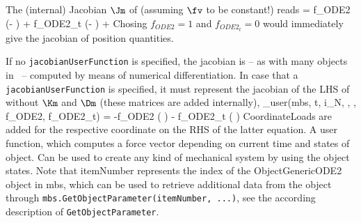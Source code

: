     The (internal) Jacobian $\Jm$ of  (assuming $\fv$ to be constant!) reads
    \be
      \Jm = f_{ODE2}   \left(\Km - \right) + 
            f_{ODE2_t} \left(\Dm -  \right) + 
    \ee
    Chosing $f_{ODE2} = 1$ and $f_{ODE2_t}=0$ would immediately give the jacobian of position quantities.
    
    If no \texttt{jacobianUserFunction} is specified, the jacobian is -- as with many objects in \codeName\ -- computed 
    by means of numerical differentiation.
    In case that a \texttt{jacobianUserFunction} is specified, it must represent the jacobian of the \ac{LHS} of  
    without $\Km$ and $\Dm$ (these matrices are added internally),
    \be \label{eq_ObjectGenericODE2_Jac}
      \Jm_{user}(mbs, t, i_N, \qv, \dot \qv, f_{ODE2}, f_{ODE2_t}) =
            -f_{ODE2}   \left( \right) - 
             f_{ODE2_t} \left( \right)
    \ee
    CoordinateLoads are added for the respective  coordinate on the RHS of the latter equation.
    A user function, which computes a force vector depending on current time and states of object. Can be used to create any kind of mechanical system by using the object states.
    Note that itemNumber represents the index of the ObjectGenericODE2 object in mbs, which can be used to retrieve additional data from the object through
    \texttt{mbs.GetObjectParameter(itemNumber, ...)}, see the according description of \texttt{GetObjectParameter}.
